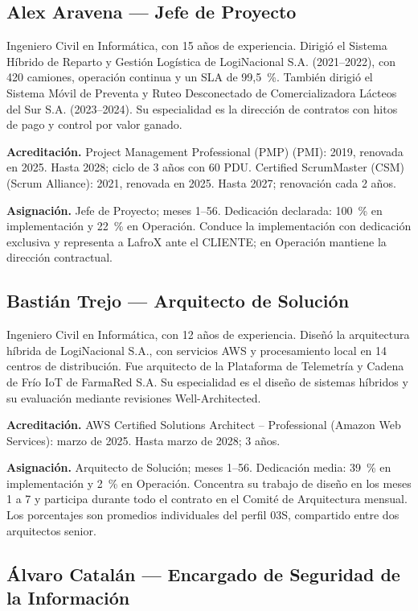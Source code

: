 \subsection{Alex Aravena — Jefe de Proyecto}

Ingeniero Civil en Informática, con 15 años de experiencia. Dirigió el Sistema Híbrido de Reparto y Gestión Logística de LogiNacional S.A. (2021--2022), con 420 camiones, operación continua y un SLA de 99,5~\%. También dirigió el Sistema Móvil de Preventa y Ruteo Desconectado de Comercializadora Lácteos del Sur S.A. (2023--2024). Su especialidad es la dirección de contratos con hitos de pago y control por valor ganado.

\textbf{Acreditación.} Project Management Professional (PMP) (PMI): 2019, renovada en 2025. Hasta 2028; ciclo de 3 años con 60 PDU. Certified ScrumMaster (CSM) (Scrum Alliance): 2021, renovada en 2025. Hasta 2027; renovación cada 2 años.

\textbf{Asignación.} Jefe de Proyecto; meses 1--56. Dedicación declarada: 100~\% en implementación y 22~\% en Operación. Conduce la implementación con dedicación exclusiva y representa a LafroX ante el CLIENTE; en Operación mantiene la dirección contractual.

\subsection{Bastián Trejo — Arquitecto de Solución}

Ingeniero Civil en Informática, con 12 años de experiencia. Diseñó la arquitectura híbrida de LogiNacional S.A., con servicios AWS y procesamiento local en 14 centros de distribución. Fue arquitecto de la Plataforma de Telemetría y Cadena de Frío IoT de FarmaRed S.A. Su especialidad es el diseño de sistemas híbridos y su evaluación mediante revisiones Well-Architected.

\textbf{Acreditación.} AWS Certified Solutions Architect -- Professional (Amazon Web Services): marzo de 2025. Hasta marzo de 2028; 3 años.

\textbf{Asignación.} Arquitecto de Solución; meses 1--56. Dedicación media: 39~\% en implementación y 2~\% en Operación. Concentra su trabajo de diseño en los meses 1 a 7 y participa durante todo el contrato en el Comité de Arquitectura mensual. Los porcentajes son promedios individuales del perfil 03S, compartido entre dos arquitectos senior.

\subsection{Álvaro Catalán — Encargado de Seguridad de la Información}

